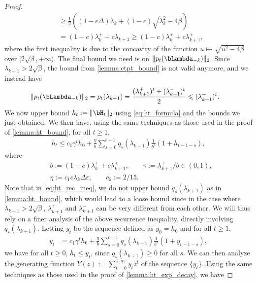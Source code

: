 \documentclass{article}
\theoremstyle{plain}
\theoremstyle{definition}
\theoremstyle{remark}
\begin{document}
\begin{proof}
\begin{align*}
    & \geqslant \frac{1}{2} \left((1 - c\Delta)\lambda_k  + (1 - c) \sqrt{\lambda_k^2 - 4\beta} \right) \\
    & = (1 - c) \lambda_k^+ + c \lambda_{k+1} \geqslant (1 - c) \lambda_k^+ + c \lambda_{k+1}^+,
  \end{align*}
  where the first inequality is due to the concavity of the function $u \mapsto \sqrt{u^2 - 4\beta}$ over $[2\sqrt{\beta}, +\infty)$. The final bound we need is on $\Vert p_t(\bLambda_{-k}) \Vert_2$. Since $\lambda_{k+1} > 2\sqrt{\beta}$, the bound from \cref{lemma:ctpt_bound} is not valid anymore, and we instead have
  \begin{align*}
    & \Vert p_t(\bLambda_{-k}) \Vert_2 = p_t(\lambda_{k+1}) = \frac{(\lambda_{k+1}^+)^t + (\lambda_{k+1}^-)^t}{2} \leqslant (\lambda_{k+1}^+)^t.
  \end{align*}
  We now upper bound $h_t := \Vert \bH_t \Vert_2$ using \eqref{eq:ht_formula} and the bounds we just obtained. We then have, using the same techniques as those used in the proof of \cref{lemma:ht_bound}, for all $t\geqslant 1$,
  \begin{align}\label{eq:ht_rec_ineq}
    h_t \leqslant c_1 \gamma^t h_0 + \frac{\eta}{b} \sum_{s=0}^{t-1} q_s(\lambda_{k+1})\frac{1}{b^{s}} (1 + h_{t-1-s}),
  \end{align}
  where 
  \begin{align*}
  & b := (1-c)\lambda_k^+ + c \lambda_{k+1}^+ , \qquad \gamma := \lambda_{k+1}^+ / b \in (0, 1), \\
  & \eta := c_1 c \lambda_k \Delta \varepsilon, \qquad c_2 := 2/15.
  \end{align*}
  Note that in \eqref{eq:ht_rec_ineq}, we do not upper bound $q_s(\lambda_{k+1})$ as in \cref{lemma:ht_bound}, which would lead to a loose bound since in the case where $\lambda_{k+1} > 2\sqrt{\beta}$, $\lambda_{k+1}^+$ and $\lambda_{k+1}^-$ can be very different from each other. We will thus rely on a finer analysis of the above recurrence inequality, directly involving $q_s(\lambda_{k+1})$. Letting $y_t$ be the sequence defined as $y_0 = h_0$ and for all $t\geqslant 1$,
  \begin{align*}
    y_t & = c_1 \gamma^t h_0 + \frac{\eta}{b} \sum_{s=0}^{t-1} q_s(\lambda_{k+1})\frac{1}{b^{s}} (1 + y_{t-1-s}),
  \end{align*}
  we have for all $t\geqslant 0$, $h_t \leqslant y_t$, since $q_s(\lambda_{k+1}) \geqslant 0$ for all $s$. We can then analyze the generating function $Y(z) := \sum_{t=0}^{+\infty} y_t z^t$ of the sequence $\{y_t\}$. Using the same techniques as those used in the proof of \cref{lemma:ht_exp_decay}, we have

\end{proof}
\end{document}
